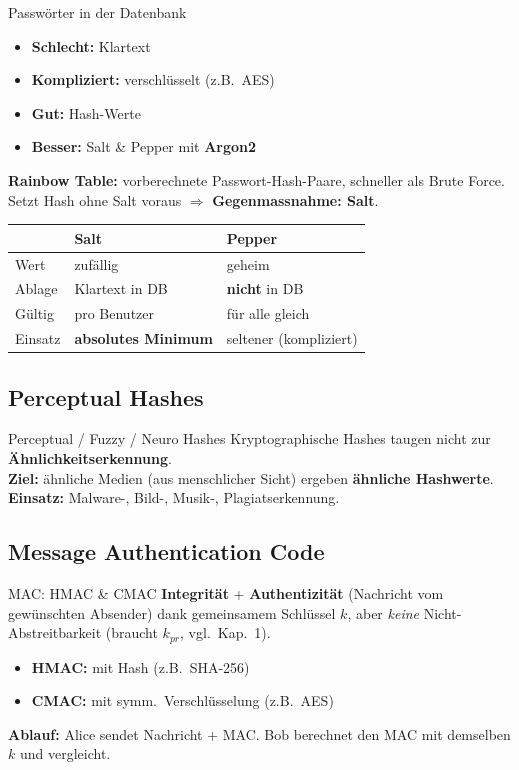 \documentclass[a4paper, fontsize=7pt]{scrartcl}
\renewcommand*{\arraystretch}{1.5}  %
\begin{document}
\begin{mainbox}{Passwörter in der Datenbank}
\begin{itemize}
    \item \textbf{Schlecht:} Klartext
    \item \textbf{Kompliziert:} verschlüsselt (z.B.\ AES)
    \item \textbf{Gut:} Hash-Werte
    \item \textbf{Besser:} Salt \& Pepper mit \textbf{Argon2}
\end{itemize}
\textbf{Rainbow Table:} vorberechnete Passwort-Hash-Paare, schneller als Brute
Force. Setzt Hash ohne Salt voraus $\Rightarrow$ \textbf{Gegenmassnahme: Salt}.
\renewcommand*{\arraystretch}{1.15}
\setlength{\tabcolsep}{3pt}
\begin{tabularx}{\linewidth}{@{}l|>{\raggedright\arraybackslash}X|>{\raggedright\arraybackslash}X@{}}
 & \textbf{Salt} & \textbf{Pepper} \\
\hline
Wert & zufällig & geheim \\
Ablage & Klartext in DB & \textbf{nicht} in DB \\
Gültig & pro Benutzer & für alle gleich \\
Einsatz & \textbf{absolutes Minimum} & seltener (kompliziert) \\
\end{tabularx}
\end{mainbox}

\subsection{Perceptual Hashes}

\begin{mainbox}{Perceptual / Fuzzy / Neuro Hashes}
Kryptographische Hashes taugen nicht zur \textbf{Ähnlichkeitserkennung}.\\
\textbf{Ziel:} ähnliche Medien (aus menschlicher Sicht) ergeben \textbf{ähnliche
Hashwerte}.\\
\textbf{Einsatz:} Malware-, Bild-, Musik-, Plagiatserkennung.
\end{mainbox}

\subsection{Message Authentication Code}

\begin{mainbox}{MAC: HMAC \& CMAC}
\textbf{Integrität} + \textbf{Authentizität} (Nachricht vom gewünschten Absender)
dank gemeinsamem Schlüssel $k$, aber \emph{keine} Nicht-Abstreitbarkeit
(braucht $k_{pr}$, vgl.\ Kap.\ 1).
\begin{itemize}
    \item \textbf{HMAC:} mit Hash (z.B.\ SHA-256)
    \item \textbf{CMAC:} mit symm.\ Verschlüsselung (z.B.\ AES)
\end{itemize}
\textbf{Ablauf:} Alice sendet Nachricht + MAC. Bob berechnet den MAC mit demselben
$k$ und vergleicht.
\end{mainbox}
\end{document}
